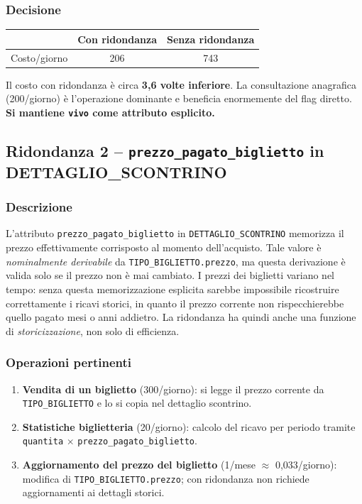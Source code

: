 \documentclass[12pt,a4paper]{report}
\begin{document}
\subsubsection*{Decisione}

\begin{center}
\begin{tabular}{lcc}
\toprule
 & \textbf{Con ridondanza} & \textbf{Senza ridondanza} \\
\midrule
Costo/giorno & 206 & 743 \\
\bottomrule
\end{tabular}
\end{center}

Il costo con ridondanza è circa \textbf{3,6 volte inferiore}. La consultazione
anagrafica (200/giorno) è l'operazione dominante e beneficia enormemente del flag
diretto. \textbf{Si mantiene \texttt{vivo} come attributo esplicito.}

\subsection*{Ridondanza 2 -- \texttt{prezzo\_pagato\_biglietto} in DETTAGLIO\_SCONTRINO}

\subsubsection*{Descrizione}

L'attributo \texttt{prezzo\_pagato\_biglietto} in \texttt{DETTAGLIO\_SCONTRINO}
memorizza il prezzo effettivamente corrisposto al momento dell'acquisto. Tale valore
è \emph{nominalmente derivabile} da \texttt{TIPO\_BIGLIETTO.prezzo}, ma questa
derivazione è valida solo se il prezzo non è mai cambiato. I prezzi dei biglietti
variano nel tempo: senza questa memorizzazione esplicita sarebbe impossibile
ricostruire correttamente i ricavi storici, in quanto il prezzo corrente non
rispecchierebbe quello pagato mesi o anni addietro. La ridondanza ha quindi anche
una funzione di \emph{storicizzazione}, non solo di efficienza.

\subsubsection*{Operazioni pertinenti}

\begin{enumerate}[itemsep=2pt]
  \item \textbf{Vendita di un biglietto} (300/giorno): si legge il prezzo corrente
        da \texttt{TIPO\_BIGLIETTO} e lo si copia nel dettaglio scontrino.
  \item \textbf{Statistiche biglietteria} (20/giorno): calcolo del ricavo per periodo
        tramite \texttt{quantita} $\times$ \texttt{prezzo\_pagato\_biglietto}.
  \item \textbf{Aggiornamento del prezzo del biglietto} (1/mese $\approx$ 0{,}033/giorno):
        modifica di \texttt{TIPO\_BIGLIETTO.prezzo}; con ridondanza non richiede
        aggiornamenti ai dettagli storici.
\end{enumerate}
\end{document}
